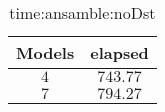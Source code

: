 \begin{table}[!ht]
	\centering
	\begin{tabular}{|c|c|}
		\hline
		Models & elapsed \\ \hline
		$4$ & $743.77$ \\ \hline
		$7$ & $794.27$ \\ \hline
	\end{tabular}
	\caption{time:ansamble:noDst}
	\label{tab:time:ansamble:noDst}
\end{table}
